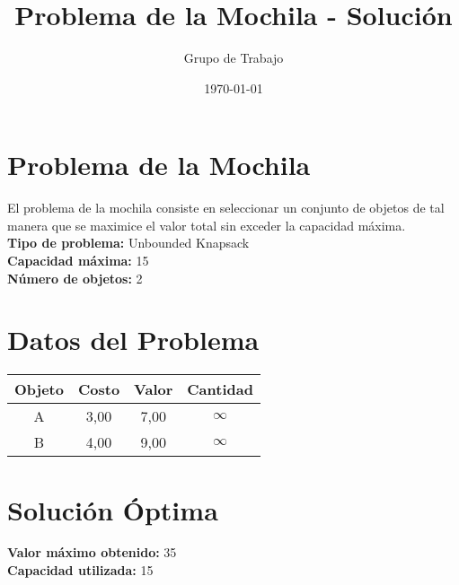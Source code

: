 \documentclass{article}
\title{Problema de la Mochila - Solución}
\author{Grupo de Trabajo}
\date{\today}
\begin{document}
\maketitle

\section*{Problema de la Mochila}
El problema de la mochila consiste en seleccionar un conjunto de objetos de tal manera que se maximice el valor total sin exceder la capacidad máxima.\\

\textbf{Tipo de problema:} Unbounded Knapsack\\
\textbf{Capacidad máxima:} 15\\
\textbf{Número de objetos:} 2\\

\section*{Datos del Problema}
\begin{tabular}{|c|c|c|c|}
\hline
Objeto & Costo & Valor & Cantidad \\
\hline
A & 3,00 & 7,00 & $\infty$ \\
B & 4,00 & 9,00 & $\infty$ \\
\hline
\end{tabular}

\section*{Solución Óptima}
\textbf{Valor máximo obtenido:} 35\\
\textbf{Capacidad utilizada:} 15\\
\end{document}
